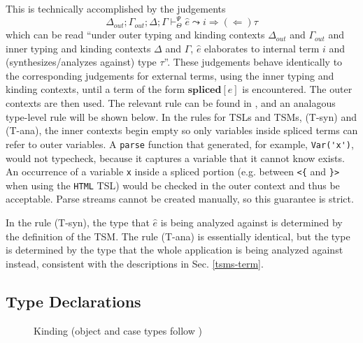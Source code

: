 \documentclass{sig-alternate}
\newcommand{\flyingbox}[1]{\fbox{{#1}}}
\newcommand{\mycaption}[1]{\vspace{-4px}\caption{#1}\vspace{-2px}}
\begin{document}
This is technically accomplished by the judgements \[\Delta_{out}; \Gamma_{out}; \Delta; \Gamma \vdash_{\Theta}^{\Psi} \hat{e} \leadsto i {\Rightarrow}{(\Leftarrow)} \tau\]  which can be read ``under outer typing and kinding contexts $\Delta_{out}$ and $\Gamma_{out}$ and inner typing and kinding contexts $\Delta$ and $\Gamma$,  $\hat{e}$ elaborates to internal term $i$ and (synthesizes/analyzes against) type $\tau$''. These judgements behave identically to the corresponding judgements for external terms, using the inner typing and kinding contexts, until a term of the form $\textbf{spliced}[e]$ is encountered. The outer contexts are then used. The relevant rule can be found in \cite{TSLs}, and an analagous type-level rule will be shown below. 
In the rules for TSLs and TSMs, (T-syn) and (T-ana), the inner contexts begin empty so only variables inside spliced terms can refer to outer variables. A \verb|parse| function that generated, for example, \verb|Var('x')|, would not typecheck, because it captures a variable that it cannot know exists. An occurrence of a variable \verb|x| inside a spliced portion (e.g. between \verb|<{| and \verb|}>| when using the \verb|HTML| TSL) would be checked in the outer context and thus be acceptable. Parse streams cannot be created manually, so this guarantee is strict. %

In the rule (T-syn), the type that $\hat{e}$ is being analyzed against is determined by the definition of the TSM. The rule (T-ana) is essentially identical, but the type is determined by the type that the whole application is being analyzed against instead, consistent with the descriptions in Sec. \ref{tsms-term}. 


\subsection{Type Declarations}\label{declarations}




\begin{figure}[ht]
\flyingbox{$\Delta\vdash_{\Theta}\tau::\kappa$}
\begin{center}
\noLine
\BIC{}
\DP
\end{center}

\begin{center}
\noLine
\BIC{}
\DP
\end{center}
\mycaption{Kinding (object and case types follow \cite{TSLs})}
\label{kinding}
\end{figure}
\end{document}
